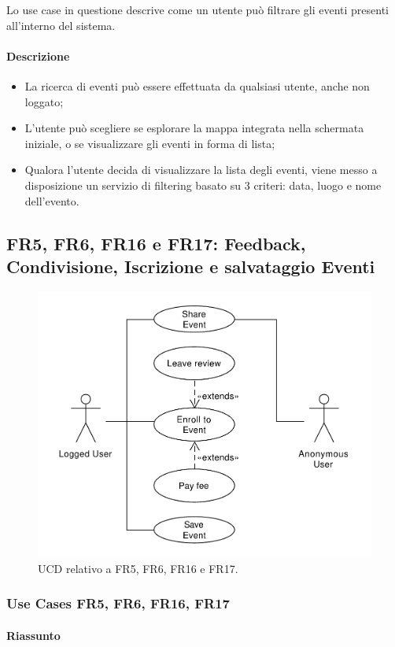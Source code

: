 \documentclass[9pt]{extarticle}
\begin{document}
Lo use case in questione descrive come un utente può filtrare gli eventi presenti all'interno del sistema.

\paragraph{Descrizione}

\begin{itemize}
	\item La ricerca di eventi può essere effettuata da qualsiasi utente, anche non loggato;
	\item L'utente può scegliere se esplorare la mappa integrata nella schermata iniziale, o se visualizzare gli eventi in forma di lista;
	\item Qualora l'utente decida di visualizzare la lista degli eventi, viene messo a disposizione un servizio di filtering basato su 3 criteri: data, luogo e nome dell'evento.
\end{itemize}

\subsection{FR5, FR6, FR16 e FR17: Feedback, Condivisione, Iscrizione e salvataggio Eventi}


\begin{figure}[!htb]
	\centering
	\includegraphics[width=.6\linewidth]{./images/FR5-6-16-17.pdf}
	\caption{UCD relativo a FR5, FR6, FR16 e FR17.}
	\label{fig:UCD_FR5-6-16-17}
\end{figure}

\subsubsection*{Use Cases FR5, FR6, FR16, FR17}

\paragraph{Riassunto}
\end{document}
